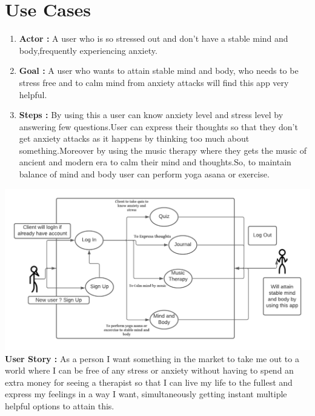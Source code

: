 \section{Use Cases}
\begin{enumerate}
    \item \textbf{Actor : } A user who is so stressed out and don't have a stable mind and body,frequently experiencing anxiety.
    \item \textbf{Goal : } A user who wants to attain stable mind and body, who needs to be stress free and to calm mind from anxiety attacks will find this app very helpful.
     \item \textbf{Steps : }By using this a user can know anxiety level and stress level by answering few questions.User can express their thoughts so that they don't get anxiety attacks as it happens by thinking too much about something.Moreover by using the music therapy where they gets the music of ancient and modern era to calm their mind and thoughts.So, to maintain balance of mind and body user can perform yoga asana or exercise.
\end{enumerate}
\includegraphics[scale=0.7]{UC.png}
\newline
\large{\textbf{User Story : }}
\newline
As a person I want something in the market to take me out to a world where I can be free of any stress or anxiety without having to spend an extra money for seeing a therapist so that I can live my life to the fullest and express my feelings in a way I want, simultaneously getting instant multiple helpful options to attain this.
